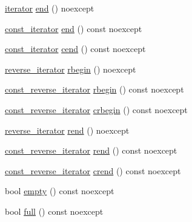 \begin{DoxyCompactItemize}
\item 
\mbox{\hyperlink{classmage_1_1_memory_buffer_af487a5f5f07f8ba65e3a5d3a26d32b6c}{iterator}} \mbox{\hyperlink{classmage_1_1_memory_buffer_a585d8f25ccd06d70981b487e1cdb4606}{end}} () noexcept
\item 
\mbox{\hyperlink{classmage_1_1_memory_buffer_a3cc14c15660c36d35195e1836db33ee7}{const\+\_\+iterator}} \mbox{\hyperlink{classmage_1_1_memory_buffer_a1c1d46af99b67f4512538b1217e0c8eb}{end}} () const noexcept
\item 
\mbox{\hyperlink{classmage_1_1_memory_buffer_a3cc14c15660c36d35195e1836db33ee7}{const\+\_\+iterator}} \mbox{\hyperlink{classmage_1_1_memory_buffer_adb3af117a8b2b2ba0f100a718fe58a43}{cend}} () const noexcept
\item 
\mbox{\hyperlink{classmage_1_1_memory_buffer_a0ff72cf71e4955a859ed8afd70832c92}{reverse\+\_\+iterator}} \mbox{\hyperlink{classmage_1_1_memory_buffer_a9c2a77b065ea73b897d8f81cb189ad62}{rbegin}} () noexcept
\item 
\mbox{\hyperlink{classmage_1_1_memory_buffer_a95188e283a195d9aa2730deb6b1c1a79}{const\+\_\+reverse\+\_\+iterator}} \mbox{\hyperlink{classmage_1_1_memory_buffer_a68cff2f94c26c8c24090b80019388d81}{rbegin}} () const noexcept
\item 
\mbox{\hyperlink{classmage_1_1_memory_buffer_a95188e283a195d9aa2730deb6b1c1a79}{const\+\_\+reverse\+\_\+iterator}} \mbox{\hyperlink{classmage_1_1_memory_buffer_acc10ff03abb4a12177d4a2e11920b7c1}{crbegin}} () const noexcept
\item 
\mbox{\hyperlink{classmage_1_1_memory_buffer_a0ff72cf71e4955a859ed8afd70832c92}{reverse\+\_\+iterator}} \mbox{\hyperlink{classmage_1_1_memory_buffer_afac3f602ce95c1eee3f8d3f3b774d211}{rend}} () noexcept
\item 
\mbox{\hyperlink{classmage_1_1_memory_buffer_a95188e283a195d9aa2730deb6b1c1a79}{const\+\_\+reverse\+\_\+iterator}} \mbox{\hyperlink{classmage_1_1_memory_buffer_a8c3f78efc7d362cb4e5c5ba4ec6b772b}{rend}} () const noexcept
\item 
\mbox{\hyperlink{classmage_1_1_memory_buffer_a95188e283a195d9aa2730deb6b1c1a79}{const\+\_\+reverse\+\_\+iterator}} \mbox{\hyperlink{classmage_1_1_memory_buffer_a77f62cb9f4a94ca60c709cf2b0566db5}{crend}} () const noexcept
\item 
bool \mbox{\hyperlink{classmage_1_1_memory_buffer_a57c8851d871387a250fdcb201019b796}{empty}} () const noexcept
\item 
bool \mbox{\hyperlink{classmage_1_1_memory_buffer_ac8b957211918ecf71cd55ac163483db2}{full}} () const noexcept

\end{DoxyCompactItemize}
